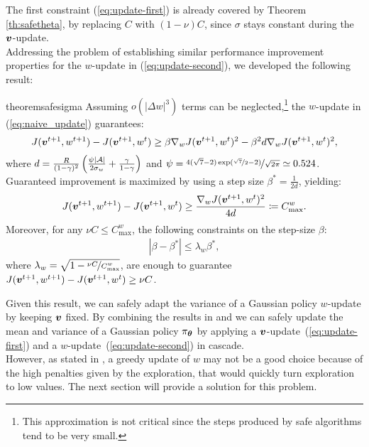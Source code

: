 The first constraint (\ref{eq:update-first}) is already covered by Theorem \ref{th:safetheta}, by replacing $C$ with $(1-\nu)C$, since $\sigma$ stays constant during the $\vv$-update. \\
Addressing the problem of establishing similar performance improvement properties for the $w$-update in (\ref{eq:update-second}), we developed the following result:
\begin{restatable}[]{theorem}{safesigma}\label{th:safesigma}
	Assuming $o(|\Delta w|^3)$ terms can be neglected,\footnote{This approximation is not critical since the steps produced by safe algorithms tend to be very small.} the $w$-update in (\ref{eq:naive_update}) guarantees:
	\begin{align}\label{stat:2_1}
	J(\vv^{t+1}, w^{t+1}) - J(\vv^{t+1}, w^t) \geq \beta\gradJ[w]{\vv^{t+1}, w^t}^2 - \beta^2 d\gradJ[w]{\vv^{t+1}, w^t}^2,
	\end{align}
	where $d=\frac{R}{(1-\gamma)^2}\left(\frac{\psi|\Aspace|}{2\sigma_{w}}+\frac{\gamma}{1-\gamma}\right)$ and $\psi = \nicefrac{4(\sqrt{7} - 2)\exp(\nicefrac{\sqrt{7}}{2} - 2)}{\sqrt{2\pi}} \simeq 0.524$. Guaranteed improvement is maximized by using a step size $\beta^*=\frac{1}{2d}$, yielding:
	\begin{align}\label{stat:2_2}
	J(\vv^{t+1},w^{t+1}) - J(\vv^{t+1}, w^t) \geq \frac{\gradJ[w]{\vv^{t+1}, w^t}^2}{4d}
	\coloneqq C_{\text{max}}^w. 
	\end{align}
	Moreover, for any $\nu C\leq C_{\text{max}}^{w}$, the following constraints on the step-size $\beta$:
	\begin{align}\label{stat:2_3}
	|\beta - \beta^*| \leq \lambda_{w}\beta^*, 
	\end{align}
	where $\lambda_{w}=\sqrt{1 - \nicefrac{\nu C}{C_{\text{max}}^{w}}}$, are enough to guarantee $J(\vv^{t+1},w^{t+1}) - J(\vv^{t+1},w^t)\geq \nu C$.
\end{restatable}

Given this result, we can safely adapt the variance of a Gaussian policy $w$-update by keeping $\vv$ fixed. By combining the results in  and  we can safely update the mean and variance of a Gaussian policy $\pi_{\vtheta}$ by applying a $\vv$-update~(\ref{eq:update-first}) and a $w$-update~(\ref{eq:update-second}) in cascade.\\
However, as stated in , a greedy update of $w$ may not be a good choice because of the high penalties given by the exploration, that would quickly turn exploration to low values. The next section will provide a solution for this problem.

